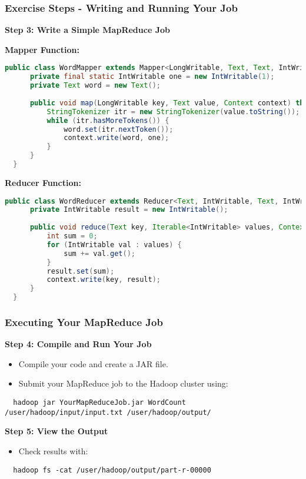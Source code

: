 \documentclass[aspectratio=169]{beamer}
\begin{document}
\begin{frame}[fragile]
  \frametitle{Exercise Steps - Writing and Running Your Job}
  
  \textbf{Step 3: Write a Simple MapReduce Job}
  
  \textbf{Mapper Function:}
  \begin{lstlisting}[language=Java]
  public class WordMapper extends Mapper<LongWritable, Text, Text, IntWritable> {
      private final static IntWritable one = new IntWritable(1);
      private Text word = new Text();
  
      public void map(LongWritable key, Text value, Context context) throws IOException, InterruptedException {
          StringTokenizer itr = new StringTokenizer(value.toString());
          while (itr.hasMoreTokens()) {
              word.set(itr.nextToken());
              context.write(word, one);
          }
      }
  }
  \end{lstlisting}

  \textbf{Reducer Function:}
  \begin{lstlisting}[language=Java]
  public class WordReducer extends Reducer<Text, IntWritable, Text, IntWritable> {
      private IntWritable result = new IntWritable();
  
      public void reduce(Text key, Iterable<IntWritable> values, Context context) throws IOException, InterruptedException {
          int sum = 0;
          for (IntWritable val : values) {
              sum += val.get();
          }
          result.set(sum);
          context.write(key, result);
      }
  }
  \end{lstlisting}
\end{frame}

\begin{frame}[fragile]
  \frametitle{Executing Your MapReduce Job}
  \textbf{Step 4: Compile and Run Your Job}
  \begin{itemize}
    \item Compile your code and create a JAR file.
    \item Submit your MapReduce job to the Hadoop cluster using:
  \end{itemize}
  
  \begin{lstlisting}
  hadoop jar YourMapReduceJob.jar WordCount /user/hadoop/input/input.txt /user/hadoop/output/
  \end{lstlisting}

  \textbf{Step 5: View the Output}
  \begin{itemize}
    \item Check results with:
  \end{itemize}
  
  \begin{lstlisting}
  hadoop fs -cat /user/hadoop/output/part-r-00000
  \end{lstlisting}
\end{frame}
\end{document}
